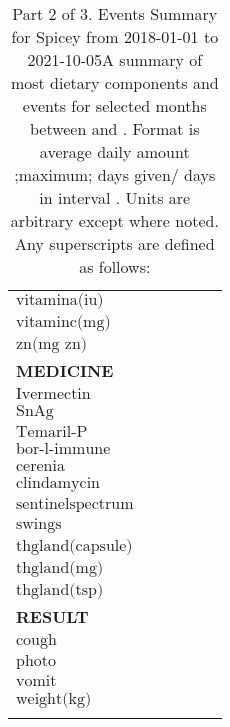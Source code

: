 \begin{table}[H]
\begin{tabular}{|l|r|r|r|r|r|}
$\textrm{vitamina(iu)}$&&&&&\\
$\textrm{vitaminc(mg)}$&&&&&\\
$\textrm{zn(mg~zn)}$&&&&&\\
{\bf MEDICINE}&&&&&\\
$\textrm{Ivermectin}$&&&&&\\
$\textrm{SnAg}$&&&&&\\
$\textrm{Temaril-P}$&&&&&\\
$\textrm{bor-l-immune}$&&&&&\\
$\textrm{cerenia}$&&&&&\\
$\textrm{clindamycin}$&&&&&\\
$\textrm{sentinelspectrum}$&&&&&\\
$\textrm{swings}$&&&&&\\
$\textrm{thgland(capsule)}$&&&&&\\
$\textrm{thgland(mg)}$&&&&&\\
$\textrm{thgland(tsp)}$&&&&&\\
{\bf RESULT}&&&&&\\
$\textrm{cough}$&&&&&\\
$\textrm{photo}$&&&&&\\
$\textrm{vomit}$&&&&&\\
$\textrm{weight(kg)}$&&&&&\\
&&&&&\\
\hline
\end{tabular}
\caption{Part 2 of 3.  Events Summary for Spicey   from 2018-01-01 to 2021-10-05A summary of most dietary components and events  for selected months between \mjmdatemin and \mjmdatemax. Format is average daily amount ;maximum; days given/ days in interval . Units are arbitrary except where noted. Any  superscripts are defined as follows:  \mjmsuperscripts}
\end{table}
